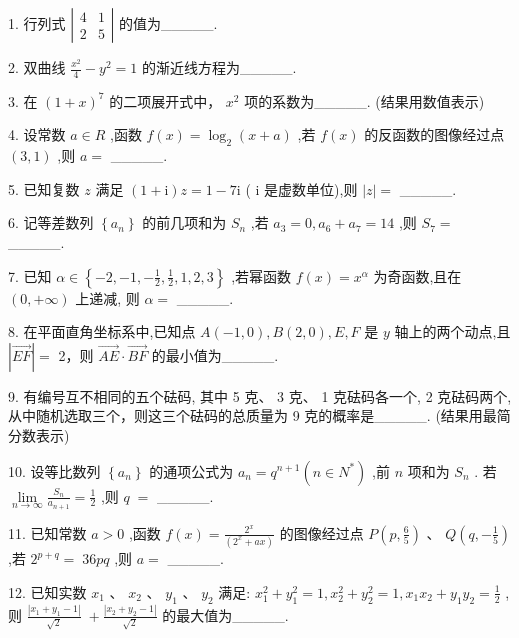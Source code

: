 \documentclass[10pt]{article}
\begin{document}
1. 行列式 \(\left| \begin{array}{ll} 4 & 1 \\  2 & 5 \end{array}\right|\) 的值为\_\_\_\_\_.

2. 双曲线 \(\frac{{x}^{2}}{4} - {y}^{2} = 1\) 的渐近线方程为\_\_\_\_\_.

3. 在 \({\left( 1 + x\right) }^{7}\) 的二项展开式中， \({x}^{2}\) 项的系数为\_\_\_\_\_. (结果用数值表示)

4. 设常数 \(a \in  R\) ,函数 \(f\left( x\right)  = {\log }_{2}\left( {x + a}\right)\) ,若 \(f\left( x\right)\) 的反函数的图像经过点 \(\left( {3,1}\right)\) ,则 \(a =\) \_\_\_\_\_.

5. 已知复数 \(z\) 满足 \(\left( {1 + \mathrm{i}}\right) z = 1 - 7\mathrm{i}\) ( \(\mathrm{i}\) 是虚数单位),则 \(\left| z\right|  =\) \_\_\_\_\_.

6. 记等差数列 \(\left\{  {a}_{n}\right\}\) 的前几项和为 \({S}_{n}\) ,若 \({a}_{3} = 0,{a}_{6} + {a}_{7} = {14}\) ,则 \({S}_{7} =\) \_\_\_\_\_.

7. 已知 \(\alpha  \in  \left\{  {-2, - 1, - \frac{1}{2},\frac{1}{2},1,2,3}\right\}\) ,若幂函数 \(f\left( x\right)  = {x}^{\alpha }\) 为奇函数,且在 \(\left( {0, + \infty }\right)\) 上递减, 则 \(\alpha  =\) \_\_\_\_\_.

8. 在平面直角坐标系中,已知点 \(A\left( {-1,0}\right) ,B\left( {2,0}\right) ,E,F\) 是 \(y\) 轴上的两个动点,且 \(\left| \overrightarrow{EF}\right|  =\) 2，则 \(\overrightarrow{AE} \cdot  \overrightarrow{BF}\) 的最小值为\_\_\_\_\_.

9. 有编号互不相同的五个砝码, 其中 5 克、 3 克、 1 克砝码各一个, 2 克砝码两个, 从中随机选取三个，则这三个砝码的总质量为 9 克的概率是\_\_\_\_\_. (结果用最简分数表示)

10. 设等比数列 \(\left\{  {a}_{n}\right\}\) 的通项公式为 \({a}_{n} = {q}^{n + 1}\left( {n \in  {N}^{ * }}\right)\) ,前 \(n\) 项和为 \({S}_{n}\) . 若 \(\mathop{\lim }\limits_{{n \rightarrow  \infty }}\frac{{S}_{n}}{{a}_{n + 1}} = \frac{1}{2}\) ,则 \(q \; =\) \_\_\_\_\_.

11. 已知常数 \(a > 0\) ,函数 \(f\left( x\right)  = \frac{{2}^{x}}{\left( {2}^{x} + ax\right) }\) 的图像经过点 \(P\left( {p,\frac{6}{5}}\right) \text{ 、 }Q\left( {q, - \frac{1}{5}}\right)\) ,若 \({2}^{p + q} = \; {36pq}\) ,则 \(a =\) \_\_\_\_\_.

12. 已知实数 \({x}_{1}\text{ 、 }{x}_{2}\text{ 、 }{y}_{1}\text{ 、 }{y}_{2}\) 满足: \({x}_{1}^{2} + {y}_{1}^{2} = 1,{x}_{2}^{2} + {y}_{2}^{2} = 1,{x}_{1}{x}_{2} + {y}_{1}{y}_{2} = \frac{1}{2}\) ,则 \(\frac{\left| {x}_{1} + {y}_{1} - 1\right| }{\sqrt{2}} \; + \frac{\left| {x}_{2} + {y}_{2} - 1\right| }{\sqrt{2}}\) 的最大值为\_\_\_\_\_.
\end{document}
